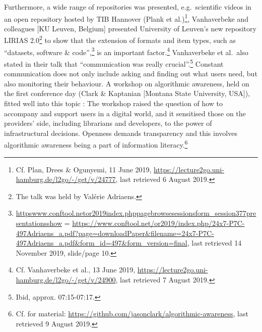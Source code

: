\documentclass[a4paper,
fontsize=11pt,
oneside,
numbers=noperiodatend,
parskip=half-,
bibliography=totoc,
final
]{scrartcl}
\begin{document}
Furthermore, a wide range of repositories was presented, e.g.~scientific
videos in an open repository hosted by TIB Hannover (Plank et
al.)\footnote{Cf. Plan, Drees \& Ogunyemi, 11 June 2019,
  \url{https://lecture2go.uni-hamburg.de/l2go/-/get/v/24777}, last
  retrieved 6 August 2019.}, Vanhaverbeke and colleagues {[}KU Leuven,
Belgium{]} presented University of Leuven's new repository LIRIAS
2.0\footnote{The talk was held by Valérie Adriaens.} to show that the
extension of formats and item types, such as \enquote{datasets, software
\& code},\footnote{\url{httpswww.conftool.netor2019index.phppagebrowsesessionsform_session377presentationsshow} = \url{https://www.conftool.net/or2019/index.php/24x7-P7C-497Adriaens_a.pdf?page=downloadPaper\&filename=24x7-P7C-497Adriaens_a.pdf\&form_id=497\&form_version=final},
  last retrieved 14 November 2019, slide/page 10.} is an important
factor.\footnote{Cf. Vanhaverbeke et al., 13 June 2019,
  \url{https://lecture2go.uni-hamburg.de/l2go/-/get/v/24900}, last
  retrieved 7 August 2019.} Vanhaverbeke et al.~also stated in their
talk that \enquote{communication was really crucial}.\footnote{Ibid,
  approx. 07:15-07:17.} Constant communication does not only include
asking and finding out what users need, but also monitoring their
behaviour. A workshop on algorithmic awareness, held on the first
conference day (Clark \& Kaptanian {[}Montana State University, USA{]}),
fitted well into this topic : The workshop raised the question of how to
accompany and support users in a digital world, and it sensitised those
on the providers' side, including librarians and developers, to the
power of infrastructural decisions. Openness demands transparency and
this involves algorithmic awareness being a part of information
literacy.\footnote{Cf. for material:
  \url{https://github.com/jasonclark/algorithmic-awareness}, last
  retrieved 9 August 2019.}
\end{document}
